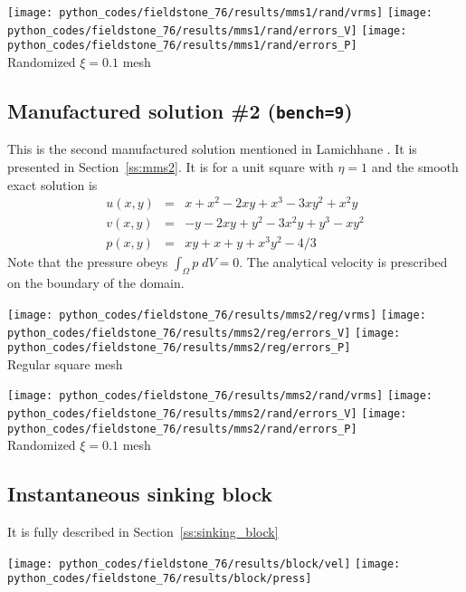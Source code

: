 \begin{center}
\texttt{[image: python\_codes/fieldstone\_76/results/mms1/rand/vrms]}
\texttt{[image: python\_codes/fieldstone\_76/results/mms1/rand/errors\_V]}
\texttt{[image: python\_codes/fieldstone\_76/results/mms1/rand/errors\_P]}\\
{\captionfont Randomized $\xi=0.1$ mesh}
\end{center}

\subsection*{Manufactured solution \#2 ({\tt bench=9})}

This is the second manufactured solution 
mentioned in Lamichhane \cite{lami17}. It is presented in Section~\ref{ss:mms2}.
It is for a unit square with $\eta=1$ and the smooth exact solution is
\begin{eqnarray}
u(x,y) &=& x+x^2 - 2xy+x^3 - 3xy^2 + x^2y \\
v(x,y) &=& -y-2xy+y^2 -3x^2y + y^3 - xy^2 \\
p(x,y) &=& xy+x+y+x^3y^2 - 4/3
\end{eqnarray}
Note that the pressure obeys $\int_{\Omega} p \; dV = 0$. The analytical 
velocity is prescribed on the boundary of the domain. 

\begin{center}
\texttt{[image: python\_codes/fieldstone\_76/results/mms2/reg/vrms]}
\texttt{[image: python\_codes/fieldstone\_76/results/mms2/reg/errors\_V]}
\texttt{[image: python\_codes/fieldstone\_76/results/mms2/reg/errors\_P]}\\
{\captionfont Regular square mesh}
\end{center}

\begin{center}
\texttt{[image: python\_codes/fieldstone\_76/results/mms2/rand/vrms]}
\texttt{[image: python\_codes/fieldstone\_76/results/mms2/rand/errors\_V]}
\texttt{[image: python\_codes/fieldstone\_76/results/mms2/rand/errors\_P]}\\
{\captionfont Randomized $\xi=0.1$ mesh}
\end{center}


\subsection*{Instantaneous sinking block}

It is fully described in Section~\ref{ss:sinking_block}

\begin{center}
\texttt{[image: python\_codes/fieldstone\_76/results/block/vel]}
\texttt{[image: python\_codes/fieldstone\_76/results/block/press]}
\end{center}


